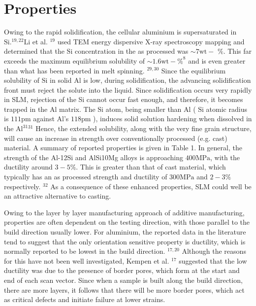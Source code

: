 \documentclass[10pt]{article}
\begin{document}
\section*{Properties}
Owing to the rapid solidification, the cellular aluminium is supersaturated in $\mathrm{Si} .{ }^{19,22} \mathrm{Li}$ et al. ${ }^{19}$ used TEM energy dispersive X-ray spectroscopy mapping and determined that the $\mathrm{Si}$ concentration in the as processed was $\sim 7 \mathrm{wt}-$ $\%$. This far exceeds the maximum equilibrium solubility of $\sim 1.6 \mathrm{wt}-\%^{8}$ and is even greater than what has been reported in melt spinning. ${ }^{29,30}$ Since the equilibrium solubility of $\mathrm{Si}$ in solid $\mathrm{Al}$ is low, during solidification, the advancing solidification front must reject the solute into the liquid. Since solidification occurs very rapidly in SLM, rejection of the Si cannot occur fast enough, and therefore, it becomes trapped in the $\mathrm{Al}$ matrix. The $\mathrm{Si}$ atom, being smaller than $\mathrm{Al}$ ( $\mathrm{Si}$ atomic radius is $111 \mathrm{pm}$ against Al's $118 \mathrm{pm}$ ), induces solid solution hardening when dissolved in the $\mathrm{Al}^{31}{ }^{31}$ Hence, the extended solubility, along with the very fine grain structure, will cause an increase in strength over conventionally processed (e.g. cast) material. A summary of reported properties is given in Table 1. In general, the strength of the Al-12Si and AlSi10Mg alloys is approaching $400 \mathrm{MPa}$, with the ductility around $3-5 \%$. This is greater than that of cast material, which typically has an as processed strength and ductility of $300 \mathrm{MPa}$ and $2-3 \%$ respectively. ${ }^{32}$ As a consequence of these enhanced properties, SLM could well be an attractive alternative to casting.

Owing to the layer by layer manufacturing approach of additive manufacturing, properties are often dependent on the testing direction, with those parallel to the build direction usually lower. For aluminium, the reported data in the literature tend to suggest that the only orientation sensitive property is ductility, which is normally reported to be lowest in the build direction. ${ }^{17,20}$ Although the reasons for this have not been well investigated, Kempen et al. ${ }^{17}$ suggested that the low ductility was due to the presence of border pores, which form at the start and end of each scan vector. Since when a sample is built along the build direction, there are more layers, it follows that there will be more border pores, which act as critical defects and initiate failure at lower strains.
\end{document}
